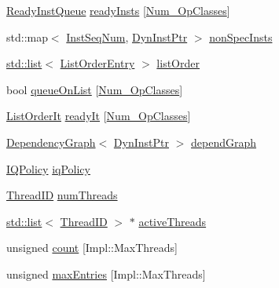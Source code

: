 \begin{DoxyCompactItemize}
\item 
\hyperlink{classInstructionQueue_a60636ae8f3b649078c4f1bdd3b20dcad}{ReadyInstQueue} \hyperlink{classInstructionQueue_a84f7fc18dadb9ea3ef6ed7dd9f375c46}{readyInsts} \mbox{[}\hyperlink{op__class_8hh_a5e0e351c8afca390ef0a05a7dbb68b1b}{Num\_\-OpClasses}\mbox{]}
\item 
std::map$<$ \hyperlink{inst__seq_8hh_a258d93d98edaedee089435c19ea2ea2e}{InstSeqNum}, \hyperlink{classInstructionQueue_a028ce10889c5f6450239d9e9a7347976}{DynInstPtr} $>$ \hyperlink{classInstructionQueue_ac0ba4d07026aaf6386c001a68d059cbf}{nonSpecInsts}
\item 
\hyperlink{classstd_1_1list}{std::list}$<$ \hyperlink{structInstructionQueue_1_1ListOrderEntry}{ListOrderEntry} $>$ \hyperlink{classInstructionQueue_afd5860c9cc9c225411df38dd3dc89b87}{listOrder}
\item 
bool \hyperlink{classInstructionQueue_abd5388bcfcc78ba7299f0178672b4ac2}{queueOnList} \mbox{[}\hyperlink{op__class_8hh_a5e0e351c8afca390ef0a05a7dbb68b1b}{Num\_\-OpClasses}\mbox{]}
\item 
\hyperlink{classInstructionQueue_a120a1fba4fe015f7201e896580df164c}{ListOrderIt} \hyperlink{classInstructionQueue_ac6c2d86489eaee465f91586553c3593f}{readyIt} \mbox{[}\hyperlink{op__class_8hh_a5e0e351c8afca390ef0a05a7dbb68b1b}{Num\_\-OpClasses}\mbox{]}
\item 
\hyperlink{classDependencyGraph}{DependencyGraph}$<$ \hyperlink{classInstructionQueue_a028ce10889c5f6450239d9e9a7347976}{DynInstPtr} $>$ \hyperlink{classInstructionQueue_a23fbbb46c9bdd183c06095cc0398fdc4}{dependGraph}
\item 
\hyperlink{classInstructionQueue_a6af49ff20e9c3b3f7ef7b8fa74c0e31b}{IQPolicy} \hyperlink{classInstructionQueue_a558c2854c6103193667179fa6ac0ac20}{iqPolicy}
\item 
\hyperlink{base_2types_8hh_ab39b1a4f9dad884694c7a74ed69e6a6b}{ThreadID} \hyperlink{classInstructionQueue_a88377f855dbf5adeeecb06b5bb821d35}{numThreads}
\item 
\hyperlink{classstd_1_1list}{std::list}$<$ \hyperlink{base_2types_8hh_ab39b1a4f9dad884694c7a74ed69e6a6b}{ThreadID} $>$ $\ast$ \hyperlink{classInstructionQueue_af6eaea53db532812052f71bf0380dab5}{activeThreads}
\item 
unsigned \hyperlink{classInstructionQueue_ac638062ba1de6609f143c5ee3a601109}{count} \mbox{[}Impl::MaxThreads\mbox{]}
\item 
unsigned \hyperlink{classInstructionQueue_a51e5f9f0cb40d61e95b1518f1be90b73}{maxEntries} \mbox{[}Impl::MaxThreads\mbox{]}

\end{DoxyCompactItemize}
